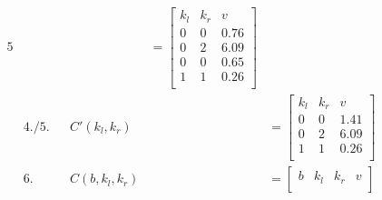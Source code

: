 \begin{figure}[H]
\begin{alignat*}{5}
         &             &              &                & = \begin{bmatrix}
                                                               k_l & k_r & v    \\
                                                               0   & 0   & 0.76 \\
                                                               0   & 2   & 6.09 \\
                                                               0   & 0   & 0.65 \\
                                                               1   & 1   & 0.26 \\
                                                           \end{bmatrix}
        \\
         & 4./5.       &              & C'(k_l, k_r)   &                                                                                      & = \begin{bmatrix}
                                                                                                                                                      k_l & k_r & v    \\
                                                                                                                                                      0   & 0   & 1.41 \\
                                                                                                                                                      0   & 2   & 6.09 \\
                                                                                                                                                      1   & 1   & 0.26 \\
                                                                                                                                                  \end{bmatrix}
        \\
         & 6.          &              & C(b, k_l, k_r) &                                                                                      & = \begin{bmatrix}
                                                                                                                                                      b & k_l & k_r & v    \\

\end{bmatrix}
\end{alignat*}
\end{figure}
